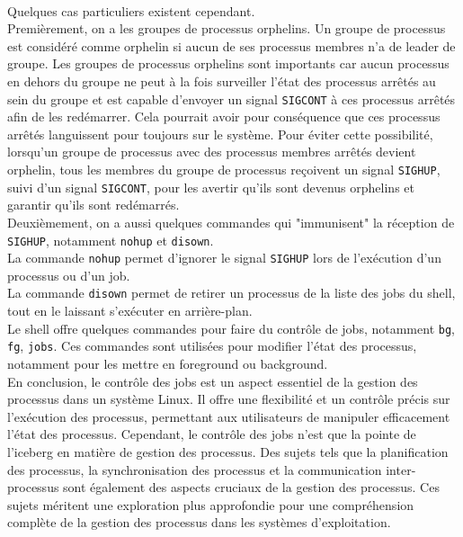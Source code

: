 \\
Quelques cas particuliers existent cependant.
\\ 
Premièrement, on a les groupes de processus orphelins. Un groupe de processus est considéré comme orphelin si aucun de ses processus membres n'a de leader de groupe. Les groupes de processus orphelins sont importants car aucun processus en dehors du groupe ne peut à la fois surveiller l'état des processus arrêtés au sein du groupe et est capable d'envoyer un signal \texttt{SIGCONT} à ces processus arrêtés afin de les redémarrer. Cela pourrait avoir pour conséquence que ces processus arrêtés languissent pour toujours sur le système. Pour éviter cette possibilité, lorsqu'un groupe de processus avec des processus membres arrêtés devient orphelin, tous les membres du groupe de processus reçoivent un signal \texttt{SIGHUP}, suivi d'un signal \texttt{SIGCONT}, pour les avertir qu'ils sont devenus orphelins et garantir qu'ils sont redémarrés.
\\ 
Deuxièmement, on a aussi quelques commandes qui "immunisent" la réception de \texttt{SIGHUP}, notamment \texttt{nohup} et \texttt{disown}.
\\ 
La commande \texttt{nohup} permet d'ignorer le signal \texttt{SIGHUP} lors de l'exécution d'un processus ou d'un job.
\\ 
La commande \texttt{disown} permet de retirer un processus de la liste des jobs du shell, tout en le laissant s'exécuter en arrière-plan.
\\ 
Le shell offre quelques commandes pour faire du contrôle de jobs, notamment \texttt{bg}, \texttt{fg}, \texttt{jobs}. Ces commandes sont utilisées pour modifier l'état des processus, notamment pour les mettre en foreground ou background.
\\
En conclusion, le contrôle des jobs est un aspect essentiel de la gestion des processus dans un système Linux. Il offre une flexibilité et un contrôle précis sur l'exécution des processus, permettant aux utilisateurs de manipuler efficacement l'état des processus. Cependant, le contrôle des jobs n'est que la pointe de l'iceberg en matière de gestion des processus. Des sujets tels que la planification des processus, la synchronisation des processus et la communication inter-processus sont également des aspects cruciaux de la gestion des processus. Ces sujets méritent une exploration plus approfondie pour une compréhension complète de la gestion des processus dans les systèmes d'exploitation.
\\